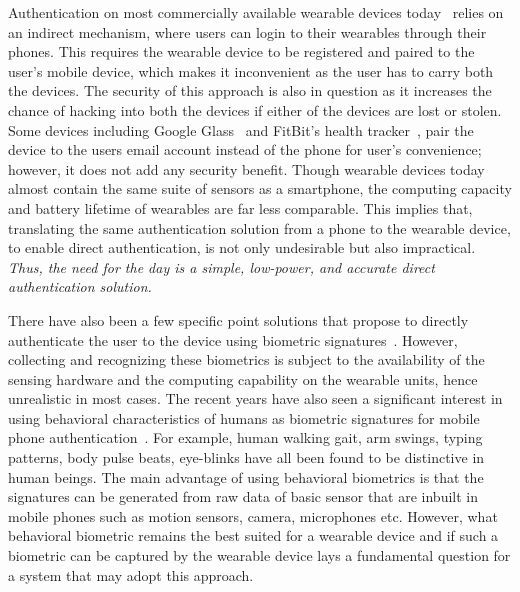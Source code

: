 \vspace{1mm}
Authentication on most commercially available wearable devices
today~\cite{fitbit, smartwatch} relies on an indirect mechanism, where users
can login to their wearables through their phones. This requires the wearable
device to be registered and paired to the user's mobile device, which makes it
inconvenient as the user has to carry both the devices. The security of this
approach is also in question as it increases the chance of hacking into
 both the devices if either of the devices are lost or stolen.
Some devices including Google Glass~\cite{googleglass} and
FitBit's health tracker~\cite{fitbit}, pair the device to the users email
account instead of the phone for user's convenience; however, it does not add any
security benefit. Though wearable devices today almost contain the same suite
of sensors as a smartphone, the computing capacity and battery lifetime of
wearables are far less comparable. This implies that, translating the same
 authentication solution from a phone to the wearable device, to enable
direct authentication, is not only undesirable but also impractical.
\emph{Thus, the need for the day is a simple, low-power, and accurate
direct authentication solution.}

There have also been a few specific point solutions that propose to directly
authenticate the user to the device using biometric signatures~\cite{rahman2014bodybeat,cornelius2014wearable}. However, collecting and recognizing these biometrics is subject
to the availability of the sensing hardware and the computing capability on
the wearable units, hence unrealistic in most
cases. The recent years have also seen a significant interest in using
behavioral characteristics of humans as biometric signatures for mobile phone
authentication~\cite{stevenage1999visual,okumura2006study,monrose2000keystroke,jorgensen2011mouse,bo2013silentsense,de2012touch}.
For example, human walking gait, arm swings, typing patterns, body pulse
beats, eye-blinks have all been found to be distinctive in human beings.
The main advantage of using behavioral biometrics is that the signatures can
be generated from raw data of basic sensor that are inbuilt in mobile phones
such as motion sensors, camera, microphones etc. However, what behavioral
biometric remains the best suited for a wearable device and if such a
biometric can be captured by the wearable device lays a fundamental question
for a system that may adopt this approach.

